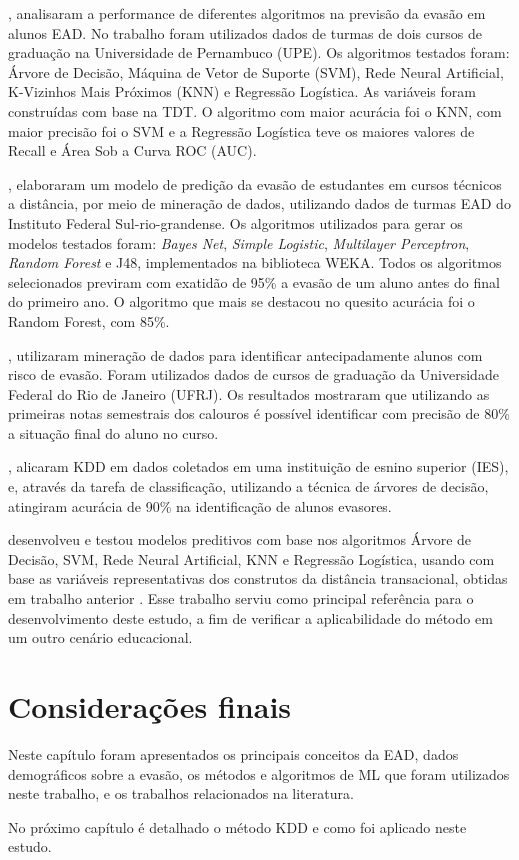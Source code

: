 , analisaram a performance de diferentes algoritmos
na previsão da evasão em alunos EAD. No trabalho foram utilizados dados de
turmas de dois cursos de graduação na Universidade de Pernambuco (UPE). Os
algoritmos testados foram: Árvore de Decisão, Máquina de Vetor de Suporte (SVM),
Rede Neural Artificial, K-Vizinhos Mais Próximos (KNN) e Regressão Logística. As
variáveis foram construídas com base na TDT. O algoritmo com maior acurácia foi
o KNN, com maior precisão foi o SVM e a Regressão Logística teve os maiores
valores de Recall e Área Sob a Curva ROC (AUC).

, elaboraram um modelo de predição da evasão de
estudantes em cursos técnicos a distância, por meio de mineração de dados,
utilizando dados de turmas EAD do Instituto
Federal Sul-rio-grandense. Os algoritmos utilizados para gerar os
modelos testados foram: \textit{Bayes Net}, \textit{Simple Logistic},
\textit{Multilayer Perceptron}, \textit{Random Forest} e J48, implementados na
biblioteca WEKA. Todos os algoritmos selecionados previram com exatidão de 95\%
a evasão de um aluno antes do final do primeiro ano. O algoritmo que mais se
destacou no quesito acurácia foi o Random Forest, com 85\%.

, utilizaram mineração de dados para identificar
antecipadamente alunos com risco de evasão. Foram utilizados dados de cursos de
graduação da Universidade Federal do Rio de Janeiro (UFRJ). Os resultados
mostraram que utilizando as primeiras notas semestrais dos calouros é possível
identificar com precisão de 80\% a situação final do aluno no curso.

, alicaram KDD em dados coletados em uma
instituição de esnino superior (IES), e, através da tarefa de classificação,
utilizando a técnica de árvores de decisão, atingiram acurácia de 90\% na
identificação de alunos evasores.

 desenvolveu e testou modelos preditivos com base
nos algoritmos Árvore de Decisão, SVM, Rede Neural Artificial, KNN e Regressão
Logística, usando com base as variáveis representativas dos construtos da
distância transacional, obtidas em trabalho anterior \cite{ramos2016mapeamento}.
Esse trabalho serviu como principal referência para o desenvolvimento deste
estudo, a fim de verificar a aplicabilidade do método em um outro cenário
educacional.

\section{Considerações finais}

Neste capítulo foram apresentados os principais conceitos da EAD, dados
demográficos sobre a evasão, os métodos e algoritmos de ML que foram utilizados
neste trabalho, e os trabalhos relacionados na literatura.

No próximo capítulo é detalhado o método KDD e como foi aplicado neste estudo.

